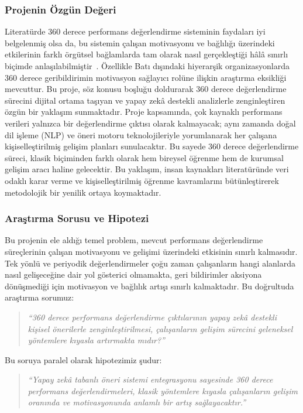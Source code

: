 \documentclass[a4paper,12pt]{article}
\begin{document}
\subsubsection*{Projenin Özgün Değeri} Literatürde 360 derece performans değerlendirme sisteminin faydaları iyi belgelenmiş olsa da, bu sistemin çalışan motivasyonu ve bağlılığı üzerindeki etkilerinin farklı örgütsel bağlamlarda tam olarak nasıl gerçekleştiği hâlâ sınırlı biçimde anlaşılabilmiştir~\cite{bapar2024_360}. Özellikle Batı dışındaki hiyerarşik organizasyonlarda 360 derece geribildirimin motivasyon sağlayıcı rolüne ilişkin araştırma eksikliği mevcuttur. Bu proje, söz konusu boşluğu doldurarak 360 derece değerlendirme sürecini dijital ortama taşıyan ve yapay zekâ destekli analizlerle zenginleştiren özgün bir yaklaşım sunmaktadır. Proje kapsamında, çok kaynaklı performans verileri yalnızca bir değerlendirme çıktısı olarak kalmayacak; aynı zamanda doğal dil işleme (NLP) ve öneri motoru teknolojileriyle yorumlanarak her çalışana kişiselleştirilmiş gelişim planları sunulacaktır. Bu sayede 360 derece değerlendirme süreci, klasik biçiminden farklı olarak hem bireysel öğrenme hem de kurumsal gelişim aracı haline gelecektir. Bu yaklaşım, insan kaynakları literatüründe veri odaklı karar verme ve kişiselleştirilmiş öğrenme kavramlarını bütünleştirerek metodolojik bir yenilik ortaya koymaktadır. 
\subsubsection*{Araştırma Sorusu ve Hipotezi}
Bu projenin ele aldığı temel problem, mevcut performans değerlendirme süreçlerinin çalışan motivasyonu ve gelişimi üzerindeki etkisinin sınırlı kalmasıdır. Tek yönlü ve periyodik değerlendirmeler çoğu zaman çalışanların hangi alanlarda nasıl gelişeceğine dair yol gösterici olmamakta, geri bildirimler aksiyona dönüşmediği için motivasyon ve bağlılık artışı sınırlı kalmaktadır. Bu doğrultuda araştırma sorumuz: 
\begin{quote}
\textit{“360 derece performans değerlendirme çıktılarının yapay zekâ destekli kişisel önerilerle zenginleştirilmesi, çalışanların gelişim sürecini geleneksel yöntemlere kıyasla artırmakta mıdır?”}
\end{quote}
Bu soruya paralel olarak hipotezimiz şudur: 
\begin{quote}
\textit{“Yapay zekâ tabanlı öneri sistemi entegrasyonu sayesinde 360 derece performans değerlendirmeleri, klasik yöntemlere kıyasla çalışanların gelişim oranında ve motivasyonunda anlamlı bir artış sağlayacaktır.”}
\end{quote}
\end{document}
